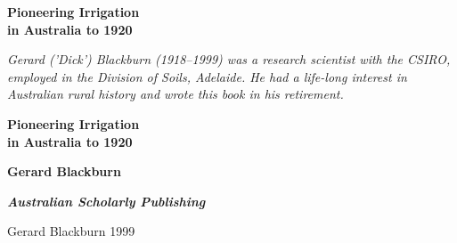 \documentclass[11pt,b5paper,titlepage]{book}
\newcommand{\clearemptydoublepage}{\newpage{\pagestyle{empty}\cleardoublepage}}
\begin{document}
%

\frontmatter

\begin{titlepage}
\pagestyle{empty}

\begin{center}

\vspace*{60mm}


{\bfseries\sffamily\Huge Pioneering Irrigation \\[0.5ex]
in Australia to 1920}

\vspace*{20mm}

\begin{center}
\begin{minipage}{85mm}
\itshape Gerard ('Dick') Blackburn (1918--1999) was a research
scientist with the CSIRO, employed in the Division of Soils,
Adelaide. He had a life-long interest in Australian rural history and
wrote this book in his retirement.
\end{minipage}
\end{center}

\end{center}
\clearemptydoublepage

\begin{center}
\vspace*{30mm}

{\bfseries\sffamily\Huge Pioneering Irrigation \\[0.5ex]
in Australia to 1920}

\vspace{30mm}
{\bfseries\sffamily\huge Gerard Blackburn}

\vspace*{\fill}
{\bfseries\sffamily\slshape\Large Australian Scholarly Publishing}
\end{center}
\newpage


\begin{raggedright}

\vspace*{15ex}

 Gerard Blackburn 1999


\end{raggedright}
\end{titlepage}
\end{document}
